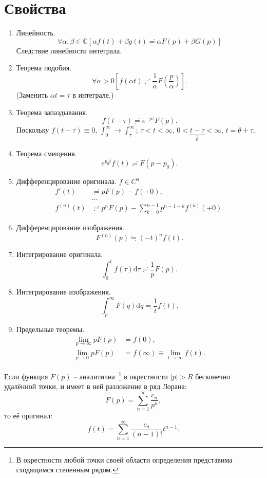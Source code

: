 \documentclass[12pt]{report}
\renewcommand{\C}{\mathbb C}
\newcommand{\rd}{\mathrm d}
\begin{document}
\section{Свойства~\cite{Dubkov:Lecture}}
\begin{enumerate}
	\item Линейность.
	\[
	\forall\alpha,\beta\in\C\left[\alpha f(t)+\beta g(t) \risingdotseq \alpha F(p) + \beta G(p)\right]
	\]
	Следствие линейности интеграла.
	\item Теорема подобия.
	\[
	\forall\alpha>0 \left[f(\alpha t) \risingdotseq \frac 1\alpha F\left(\frac p\alpha\right) \right].
	\]
	(Заменить $\alpha t = \tau$ в интеграле.)
	\item Теорема запаздывания.\label{itm:prop-offset}
	\[
	f(t-\tau) \risingdotseq e^{-p\tau} F(p).
	\]
	Поскольку $f(t-\tau) \equiv 0$, $\int_0^\infty \to \int_\tau^\infty$; $\tau < t < \infty$, 
	$0 < \underbrace{t-\tau}_{\theta} < \infty$, $t = \theta + \tau$.
	\item Теорема смещения.
	\[
	e^{p_0t} f(t) \risingdotseq F(p-p_0).
	\]
	\item Дифференцирование оригинала. $f\in C^n$ \label{itm:prop-diff-original}
	\begin{align*}
	f'(t) &\risingdotseq p F(p) - f(+0), \\
	&\dots \\
	f^{(n)}(t) &\risingdotseq p^nF(p) -\sum_{k=0}^{n-1}p^{n-1-k}f^{(k)}(+0).
	\end{align*}
	\item Дифференцирование изображения.
	\[
	F^{(n)}(p) \fallingdotseq (-t)^nf(t).
	\]
	\item  Интегрирование оригинала.
	\[
	\int_0^t f(\tau)\rd\tau \risingdotseq \frac 1p F(p).
	\]
	\item Интегрирование изображения.
	\[
	\int_p^\infty F(q)\rd q \fallingdotseq \frac 1t f(t).
	\]
	\item Предельные теоремы.
	\begin{align*}
		\lim\limits_{p\to \infty} pF(p) &= f(0),\\
		\lim\limits_{p\to0} pF(p) &= f(\infty) \equiv \lim_{t\to\infty}f(t).
	\end{align*}
\end{enumerate}

\begin{thm}
	Если функция $F(p)$ -- аналитична~\footnote{В окрестности любой точки своей области определения представима сходящимся степенным рядом.} в окрестности $|p|>R$ бесконечно удалённой точки, и имеет в ней разложение в ряд Лорана:
	\[
	F(p) = \sum_{n=1}^{\infty}\frac{c_n}{p^n},
	\]
	то её оригинал:
	\[
	f(t) = \sum_{n=1}^{\infty}\frac{c_n}{(n-1)!}t^{n-1}.
	\]
\end{thm}
\end{document}
